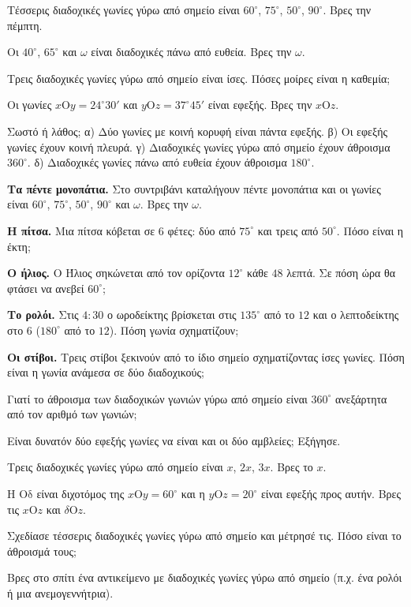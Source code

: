 \ex Τέσσερις διαδοχικές γωνίες γύρω από σημείο είναι $60^\circ$, $75^\circ$, $50^\circ$, $90^\circ$. Βρες την πέμπτη.

\ex Οι $40^\circ$, $65^\circ$ και $\omega$ είναι διαδοχικές πάνω από ευθεία. Βρες την $\omega$.

\ex Τρεις διαδοχικές γωνίες γύρω από σημείο είναι ίσες. Πόσες μοίρες είναι η καθεμία;

\ex Οι γωνίες $x\mathrm{Ο}y=24^\circ30'$ και $y\mathrm{Ο}z=37^\circ45'$ είναι εφεξής. Βρες την $x\mathrm{Ο}z$.

\ex Σωστό ή λάθος; α) Δύο γωνίες με κοινή κορυφή είναι πάντα εφεξής. \quad β) Οι εφεξής γωνίες έχουν κοινή πλευρά. \quad γ) Διαδοχικές γωνίες γύρω από σημείο έχουν άθροισμα $360^\circ$. \quad δ) Διαδοχικές γωνίες πάνω από ευθεία έχουν άθροισμα $180^\circ$.


\ex \textbf{Τα πέντε μονοπάτια.} Στο συντριβάνι καταλήγουν πέντε μονοπάτια και οι γωνίες είναι $60^\circ$, $75^\circ$, $50^\circ$, $90^\circ$ και $\omega$. Βρες την $\omega$.

\ex \textbf{Η πίτσα.} Μια πίτσα κόβεται σε $6$ φέτες: δύο από $75^\circ$ και τρεις από $50^\circ$. Πόσο είναι η έκτη;

\ex \textbf{Ο ήλιος.} Ο Ήλιος σηκώνεται από τον ορίζοντα $12^\circ$ κάθε $48$ λεπτά. Σε πόση ώρα θα φτάσει να ανεβεί $60^\circ$;

\ex \textbf{Το ρολόι.} Στις $4{:}30$ ο ωροδείκτης βρίσκεται στις $135^\circ$ από το $12$ και ο λεπτοδείκτης στο $6$ ($180^\circ$ από το $12$). Πόση γωνία σχηματίζουν;

\ex \textbf{Οι στίβοι.} Τρεις στίβοι ξεκινούν από το ίδιο σημείο σχηματίζοντας ίσες γωνίες. Πόση είναι η γωνία ανάμεσα σε δύο διαδοχικούς;


\ex Γιατί το άθροισμα των διαδοχικών γωνιών γύρω από σημείο είναι $360^\circ$ ανεξάρτητα από τον αριθμό των γωνιών;

\ex Είναι δυνατόν δύο εφεξής γωνίες να είναι και οι δύο αμβλείες; Εξήγησε.

\ex Τρεις διαδοχικές γωνίες γύρω από σημείο είναι $x$, $2x$, $3x$. Βρες το $x$.

\ex Η $\mathrm{Οδ}$ είναι διχοτόμος της $x\mathrm{Ο}y=60^\circ$ και η $y\mathrm{Ο}z=20^\circ$ είναι εφεξής προς αυτήν. Βρες τις $x\mathrm{Ο}z$ και $\delta\mathrm{Ο}z$.


\ex Σχεδίασε τέσσερις διαδοχικές γωνίες γύρω από σημείο και μέτρησέ τις. Πόσο είναι το άθροισμά τους;

\ex Βρες στο σπίτι ένα αντικείμενο με διαδοχικές γωνίες γύρω από σημείο (π.χ. ένα ρολόι ή μια ανεμογεννήτρια).

